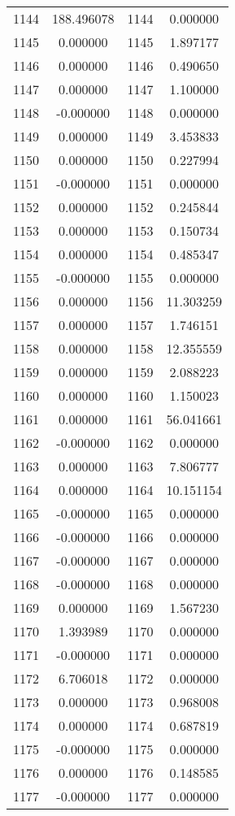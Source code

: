\documentclass[12pt]{article}
\begin{document}
\begin{longtable}{@{}cccc@{}}
1144 & 188.496078 & 1144 & 0.000000 \\
1145 & 0.000000 & 1145 & 1.897177 \\
1146 & 0.000000 & 1146 & 0.490650 \\
1147 & 0.000000 & 1147 & 1.100000 \\
1148 & -0.000000 & 1148 & 0.000000 \\
1149 & 0.000000 & 1149 & 3.453833 \\
1150 & 0.000000 & 1150 & 0.227994 \\
1151 & -0.000000 & 1151 & 0.000000 \\
1152 & 0.000000 & 1152 & 0.245844 \\
1153 & 0.000000 & 1153 & 0.150734 \\
1154 & 0.000000 & 1154 & 0.485347 \\
1155 & -0.000000 & 1155 & 0.000000 \\
1156 & 0.000000 & 1156 & 11.303259 \\
1157 & 0.000000 & 1157 & 1.746151 \\
1158 & 0.000000 & 1158 & 12.355559 \\
1159 & 0.000000 & 1159 & 2.088223 \\
1160 & 0.000000 & 1160 & 1.150023 \\
1161 & 0.000000 & 1161 & 56.041661 \\
1162 & -0.000000 & 1162 & 0.000000 \\
1163 & 0.000000 & 1163 & 7.806777 \\
1164 & 0.000000 & 1164 & 10.151154 \\
1165 & -0.000000 & 1165 & 0.000000 \\
1166 & -0.000000 & 1166 & 0.000000 \\
1167 & -0.000000 & 1167 & 0.000000 \\
1168 & -0.000000 & 1168 & 0.000000 \\
1169 & 0.000000 & 1169 & 1.567230 \\
1170 & 1.393989 & 1170 & 0.000000 \\
1171 & -0.000000 & 1171 & 0.000000 \\
1172 & 6.706018 & 1172 & 0.000000 \\
1173 & 0.000000 & 1173 & 0.968008 \\
1174 & 0.000000 & 1174 & 0.687819 \\
1175 & -0.000000 & 1175 & 0.000000 \\
1176 & 0.000000 & 1176 & 0.148585 \\
1177 & -0.000000 & 1177 & 0.000000 \\

\end{longtable}
\end{document}
